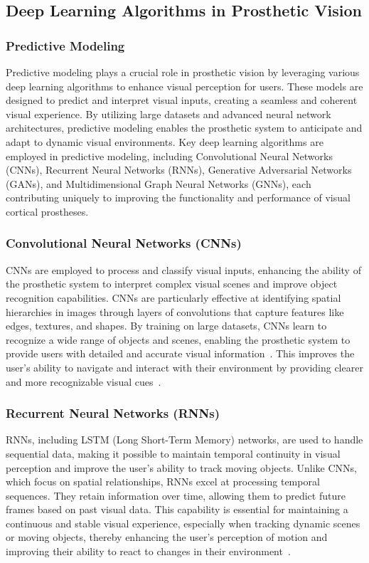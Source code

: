 \documentclass[twocolumn,10pt]{article}
\begin{document}
\subsection{Deep Learning Algorithms in Prosthetic Vision}
\subsubsection*{Predictive Modeling}
Predictive modeling plays a crucial role in prosthetic vision by leveraging
various deep learning algorithms to enhance visual perception for users. These
models are designed to predict and interpret visual inputs, creating a seamless
and coherent visual experience. By utilizing large datasets and advanced neural
network architectures, predictive modeling enables the prosthetic system to
anticipate and adapt to dynamic visual environments. Key deep learning
algorithms are employed in predictive modeling, including
Convolutional Neural Networks (CNNs), Recurrent Neural Networks (RNNs),
Generative Adversarial Networks (GANs), and Multidimensional Graph Neural
Networks (GNNs), each contributing uniquely to improving the functionality and
performance of visual cortical prostheses.

\subsubsection*{Convolutional Neural Networks (CNNs)}
CNNs are employed to process and classify visual inputs, enhancing the ability
of the prosthetic system to interpret complex visual scenes and improve object
recognition capabilities. CNNs are particularly effective at identifying spatial
hierarchies in images through layers of convolutions that capture features like
edges, textures, and shapes. By training on large datasets, CNNs learn to
recognize a wide range of objects and scenes, enabling the prosthetic system to
provide users with detailed and accurate visual
information~\parencite{petrosyanDecodingInterpretingCortical2021a}. This improves the
user's ability to navigate and interact with their environment by providing
clearer and more recognizable visual
cues~\parencite{maheswaranathanInterpretingRetinalNeural2023}.

\subsubsection*{Recurrent Neural Networks (RNNs)}
RNNs, including LSTM (Long Short-Term Memory) networks, are used to handle
sequential data, making it possible to maintain temporal continuity in visual
perception and improve the user's ability to track moving objects. Unlike CNNs,
which focus on spatial relationships, RNNs excel at processing temporal
sequences. They retain information over time, allowing them to predict future
frames based on past visual data. This capability is essential for maintaining a
continuous and stable visual experience, especially when tracking dynamic scenes
or moving objects, thereby enhancing the user's perception of motion and
improving their ability to react to changes in their
environment~\parencite{nayebiRecurrentConnectionsPrimate2022, liaoBridgingGapsResidual2016}.
\end{document}

